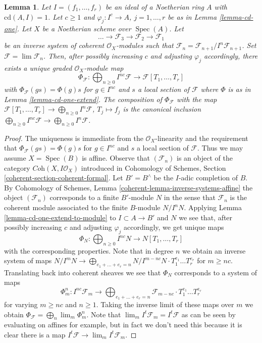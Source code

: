 \documentclass[10pt,a4paper]{amsart}
\theoremstyle{plain}
\newtheorem{lemma}[subsection]{Lemma}
\theoremstyle{definition}
\theoremstyle{remark}
\numberwithin{equation}{subsection}
\def\lim{\mathop{\mathrm{lim}}\nolimits}
\def\Spec{\mathop{\mathrm{Spec}}}
\begin{document}
\begin{lemma}
\label{lemma-cd-is-one-for-system}
Let $I = (f_1, \ldots, f_r)$ be an ideal of a Noetherian ring $A$ with
$\text{cd}(A, I) = 1$. Let $c \geq 1$ and $\varphi_j : I^c \to A$,
$j = 1, \ldots, r$ be as in Lemma \ref{lemma-cd-one}.
Let $X$ be a Noetherian scheme over $\Spec(A)$. Let
$$
\ldots \to \mathcal{F}_3 \to \mathcal{F}_2 \to \mathcal{F}_1
$$
be an inverse system of coherent $\mathcal{O}_X$-modules
such that $\mathcal{F}_n = \mathcal{F}_{n + 1}/I^n\mathcal{F}_{n + 1}$.
Set $\mathcal{F} = \lim \mathcal{F}_n$.
Then, after possibly increasing $c$ and adjusting $\varphi_j$ accordingly,
there exists a unique graded $\mathcal{O}_X$-module map
$$
\Phi_\mathcal{F} :
\bigoplus\nolimits_{n \geq 0} I^{nc}\mathcal{F}
\longrightarrow
\mathcal{F}[T_1, \ldots, T_r]
$$
with $\Phi_\mathcal{F}(g s) = \Phi(g) s$ for $g \in I^{nc}$ and
$s$ a local section of $\mathcal{F}$ where $\Phi$ is as in
Lemma \ref{lemma-cd-one-extend}. The composition of $\Phi_\mathcal{F}$
with the map
$\mathcal{F}[T_1, \ldots, T_r] \to \bigoplus_{n \geq 0} I^n\mathcal{F}$,
$T_j \mapsto f_j$
is the canonical inclusion
$\bigoplus_{n \geq 0} I^{nc}\mathcal{F} \to
\bigoplus_{n \geq 0} I^n\mathcal{F}$.
\end{lemma}

\begin{proof}
The uniqueness is immediate from the $\mathcal{O}_X$-linearity
and the requirement that $\Phi_\mathcal{F}(g s) = \Phi(g) s$ for
$g \in I^{nc}$ and $s$ a local section of $\mathcal{F}$.
Thus we may assume $X = \Spec(B)$ is affine.
Observe that $(\mathcal{F}_n)$ is an object of the category
$\textit{Coh}(X, I\mathcal{O}_X)$ introduced
in Cohomology of Schemes, Section \ref{coherent-section-coherent-formal}.
Let $B' = B^\wedge$ be the $I$-adic completion of $B$.
By Cohomology of Schemes, Lemma \ref{coherent-lemma-inverse-systems-affine}
the object $(\mathcal{F}_n)$ corresponds to a finite $B'$-module $N$
in the sense that $\mathcal{F}_n$ is the coherent
module associated to the finite $B$-module $N/I^n N$.
Applying Lemma \ref{lemma-cd-one-extend-to-module}
to $I \subset A \to B'$ and $N$
we see that, after possibly increasing $c$ and adjusting
$\varphi_j$ accordingly, we get unique maps
$$
\Phi_N : \bigoplus\nolimits_{n \geq 0} I^{nc}N \to N[T_1, \ldots, T_r]
$$
with the corresponding properties. Note that in degree $n$ we obtain
an inverse system of maps $N/I^mN \to \bigoplus_{e_1 + \ldots + e_r = n}
N/I^{m - nc}N \cdot T_1^{e_1} \ldots T_r^{e_r}$ for $m \geq nc$.
Translating back into coherent
sheaves we see that $\Phi_N$ corresponds to a system of maps
$$
\Phi^n_m :
I^{nc}\mathcal{F}_m
\longrightarrow
\bigoplus\nolimits_{e_1 + \ldots + e_r = n}
\mathcal{F}_{m - nc} \cdot T_1^{e_1} \ldots T_r^{e_r}
$$
for varying $m \geq nc$ and $n \geq 1$. Taking the inverse limit of
these maps over $m$ we obtain $\Phi_\mathcal{F} = \bigoplus_n \lim_m \Phi^n_m$.
Note that $\lim_m I^t\mathcal{F}_m = I^t \mathcal{F}$ as can be seen by
evaluating on affines for example, but in fact we don't need this because
it is clear there is a map $I^t\mathcal{F} \to \lim_m I^t\mathcal{F}_m$.
\end{proof}
\end{document}
